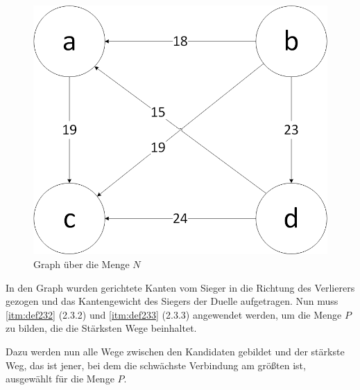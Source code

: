 \begin{figure}[!h]
\centering
\includegraphics[scale=0.5]{Bilder/Beispiel1_Graph.png}
\caption{Graph über die Menge $N$}
\label{fig:graph1}
\end{figure}

In den Graph wurden gerichtete Kanten vom Sieger in die Richtung des Verlierers gezogen und das Kantengewicht des Siegers der Duelle aufgetragen. Nun muss \ref{itm:def232} (2.3.2) und \ref{itm:def233} (2.3.3) angewendet werden, um die Menge $P$ zu bilden, die die Stärksten Wege beinhaltet.

Dazu werden nun alle Wege zwischen den Kandidaten gebildet und der stärkste Weg, das ist jener, bei dem die schwächste Verbindung am größten ist, ausgewählt für die Menge $P$.

